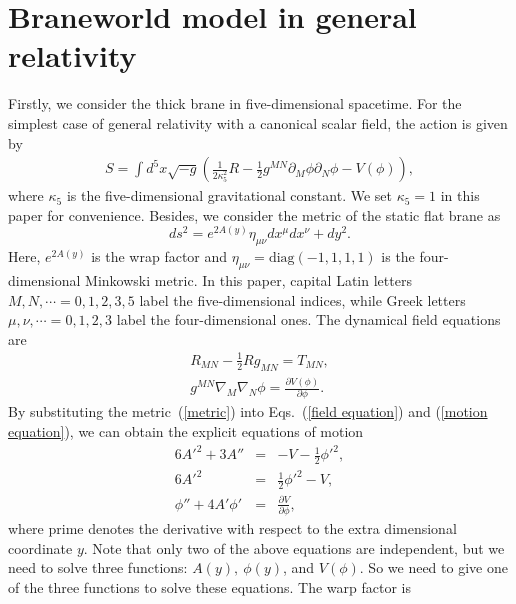 \section{Braneworld model in general relativity}
\label{BRANE WORLD MODEL}
Firstly, we consider the thick brane in five-dimensional spacetime. For the simplest case of general relativity with a canonical scalar field, the action is given by
\begin{eqnarray}
  S=\int d^5x\sqrt{-g}\left(\frac{1}{2\kappa^{2}_{5}}R-\frac{1}{2}g^{MN}\partial_{M}
  \phi\partial_{N}\phi-V(\phi)\right),\label{action}
\end{eqnarray}
where $\kappa_{5}$ is the five-dimensional gravitational constant. We set $\kappa_{5}=1$ in this paper for convenience. Besides, we consider the metric of the static flat brane as
\begin{equation}
   ds^2=e^{2A(y)}\eta_{\mu\nu}dx^\mu dx^\nu+dy^2.
   \label{metric}
\end{equation}
Here, $e^{2A(y)}$ is the wrap factor and $\eta_{\mu\nu}=\text{diag}(-1,1,1,1)$ is the four-dimensional Minkowski metric. In this paper, capital Latin letters $M,N,\cdots= 0,1,2,3,5$ label the five-dimensional indices, while Greek letters $\mu,\nu,\cdots= 0,1,2,3$ label the four-dimensional ones. The dynamical field equations are
\begin{eqnarray}
R_{MN}-\frac{1}{2}Rg_{MN}=T_{MN},\label{field equation}\\
g^{MN}\nabla_{M}\nabla_{N}\phi=\frac{\partial V(\phi)}{\partial\phi}.\label{motion equation}
\end{eqnarray}
By substituting the metric~(\ref{metric}) into Eqs.~(\ref{field equation}) and (\ref{motion equation}), we can obtain the explicit equations of motion
\begin{eqnarray}
6A'^2 +3A''&=&-V-\frac{1}{2}\phi'^2,  \label{EoMs1}\\
6A'^2&=&\frac{1}{2}\phi'^2-V,  \label{EoMs2}\\
\phi{''}+4A'\phi'&=&\frac{\partial V}{\partial\phi},  \label{EoMsphi}
\end{eqnarray}
where prime denotes the derivative with respect to the extra dimensional coordinate $y$. Note that only two of the above equations are independent, but we need to solve three functions: $A(y),~\phi(y)$, and $V(\phi)$. So we need to give one of the three functions to solve these equations. The warp factor is

